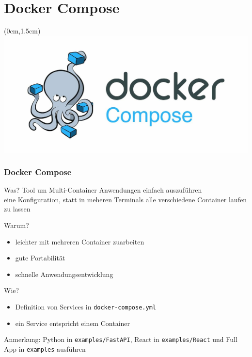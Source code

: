 \documentclass[22pt]{beamer}
\newcommand{\code}[1]{\colorbox{gray!10}{\texttt{#1}}}
\begin{document}
\section{Docker Compose}
\begin{frame}[plain]
    \begin{textblock*}{\paperwidth}(0cm,1.5cm) %
        \includegraphics[width=\paperwidth]{Bilder/1200px-Docker-compose-logo.jpg}
    \end{textblock*}
\end{frame}

\begin{frame}[t]
    \frametitle{Docker Compose}
    \begin{block}{Was?}
        Tool um Multi-Container Anwendungen einfach auszuführen\\
        eine Konfiguration, statt in meheren Terminals alle verschiedene Container laufen zu lassen
    \end{block}\pause
    \begin{block}{Warum?}
        \begin{itemize}
            \item leichter mit mehreren Container zuarbeiten
            \item gute Portabilität
            \item schnelle Anwendungsentwicklung
        \end{itemize}
    \end{block}\pause
    \begin{block}{Wie?}
        \begin{itemize}
            \item Definition von Services in \code{docker-compose.yml}
            \item ein Service entspricht einem Container
        \end{itemize}
    \end{block}
    \medskip
    \footnotesize Anmerkung: Python in \code{examples/FastAPI}, React in \code{examples/React} und Full App in \code{examples} ausführen
\end{frame}
\end{document}
